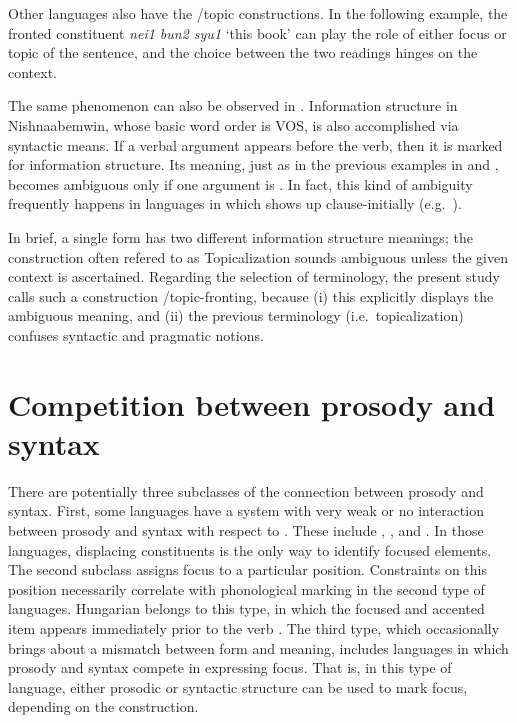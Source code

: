 Other languages also have the /topic  constructions. In
the following  example, the fronted constituent \textit{nei1
  bun2 syu1} `this book' can play the role of either focus or topic of
the sentence, and the choice between the two readings hinges on the
context.





\noindent The same phenomenon can also be observed in
.  Information structure in Nishnaabemwin, whose
basic word order is VOS, is also accomplished via syntactic means.  If
a verbal argument appears before the verb, then it is marked for
information structure.  Its meaning, just as in the previous examples
in  and , becomes ambiguous only if one
argument is  \citep{valentine:01}.  In fact, this kind
of ambiguity frequently happens in languages in which 
shows up clause-initially (e.g.\ ).




In brief, a single form has two different information structure
meanings; the construction often refered to as Topicalization
\citep{prince:84} sounds ambiguous unless the given context is
ascertained.  Regarding the selection of terminology, the present
study calls such a construction /topic-fronting, because (i) this
explicitly displays the ambiguous meaning, and (ii) the previous
terminology (i.e.\ topicalization) confuses syntactic and pragmatic
notions.



\section{Competition between prosody and syntax}
\label{5:sec:competition}
 
There are potentially three subclasses of the connection between
prosody and syntax.  First, some languages have a system with very
weak or no interaction between prosody and syntax with respect to
. These include 
\citep{engdahl:vallduvi:96},  \citep{drubig:03}, and
 \citep{kugler:etal:07}. In those languages,
displacing constituents is the only way to identify focused
elements. The second subclass assigns focus to a particular
position. Constraints on this position necessarily correlate with
phonological marking in the second type of languages.  Hungarian
belongs to this type, in which the focused and accented item appears
immediately prior to the verb \citep{kiss:98,szendroi:01}. The third
type, which occasionally brings about a mismatch between form and
meaning, includes languages in which prosody and syntax compete in
expressing focus. That is, in this type of language,
either prosodic or syntactic structure can be used to mark focus,
depending on the construction.


